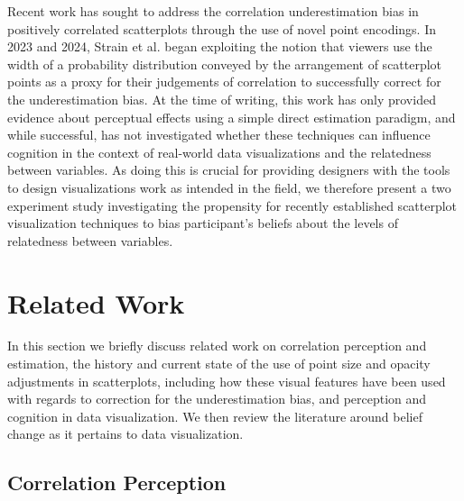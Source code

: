 \documentclass[manuscript,screen,review]{acmart}
\begin{document}
Recent work has sought to address the correlation underestimation bias
in positively correlated scatterplots through the use of novel point
encodings. In 2023 and 2024, Strain et al.
\citep{strain_2023, strain_2023b, strain_2024} began exploiting the
notion that viewers use the width of a probability distribution conveyed
by the arrangement of scatterplot points as a proxy for their judgements
of correlation to successfully correct for the underestimation bias. At
the time of writing, this work has only provided evidence about
perceptual effects using a simple direct estimation paradigm, and while
successful, has not investigated whether these techniques can influence
cognition in the context of real-world data visualizations and the
relatedness between variables. As doing this is crucial for providing
designers with the tools to design visualizations work as intended in
the field, we therefore present a two experiment study investigating the
propensity for recently established scatterplot visualization techniques
to bias participant's beliefs about the levels of relatedness between
variables.

\section{Related Work}\label{sec-rel-work-main}

In this section we briefly discuss related work on correlation
perception and estimation, the history and current state of the use of
point size and opacity adjustments in scatterplots, including how these
visual features have been used with regards to correction for the
underestimation bias, and perception and cognition in data
visualization. We then review the literature around belief change as it
pertains to data visualization.

\subsection{Correlation Perception}\label{sec-corr-percept}
\end{document}
